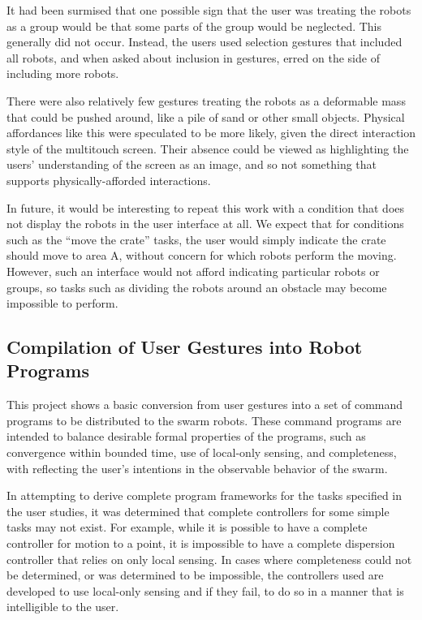 It had been surmised that one possible sign that the user was treating the robots as a group would be that some parts of the group would be neglected. 
This generally did not occur. 
Instead, the users used selection gestures that included all robots, and when asked about inclusion in gestures, erred on the side of including more robots. 

There were also relatively few gestures treating the robots as a deformable mass that could be pushed around, like a pile of sand or other small objects. 
Physical affordances like this were speculated to be more likely, given the direct interaction style of the multitouch screen. 
Their absence could be viewed as highlighting the users' understanding of the screen as an image, and so not something that supports physically-afforded interactions. 

In future, it would be interesting to repeat this work with a condition that does not display the robots in the user interface at all. 
We expect that for conditions such as the ``move the crate'' tasks, the user would simply indicate the crate should move to area A, without concern for which robots perform the moving. 
However, such an interface would not afford indicating particular robots or groups, so tasks such as dividing the robots around an obstacle may become impossible to perform. 

\subsection{Compilation of User Gestures into Robot Programs} \label{section:Compilation_of_User_Gestures_into_Robot_Programs}

This project shows a basic conversion from user gestures into a set of command programs to be distributed to the swarm robots.
These command programs are intended to balance desirable formal properties of the programs, such as convergence within bounded time, use of local-only sensing, and completeness, with reflecting the user's intentions in the observable behavior of the swarm. 

In attempting to derive complete program frameworks for the tasks specified in the user studies, it was determined that complete controllers for some simple tasks may not exist. 
For example, while it is possible to have a complete controller for motion to a point, it is impossible to have a complete dispersion controller that relies on only local sensing. 
In cases where completeness could not be determined, or was determined to be impossible, the controllers used are developed to use local-only sensing and if they fail, to do so in a manner that is intelligible to the user. 

